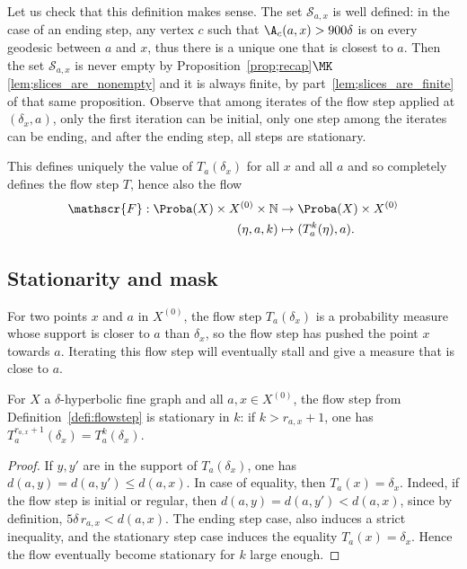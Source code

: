 Let us check that this definition makes sense. The set $\mathcal{S}_{a,x}$ is well defined: in the case of an ending step, any vertex $c$ such that $\A_c(a,x) > 900\delta$ is on every geodesic between $a$ and $x$, thus there is a unique one that is closest to $a$. Then the set $\mathcal{S}_{a,x}$ is never empty by Proposition~\ref{prop;recap}$\MK$\eqref{lem;slices_are_nonempty} and it is always finite, by part~\eqref{lem;slices_are_finite} of that same proposition. Observe that among iterates of the flow step applied at $(\delta_x, a)$, only the first iteration can be initial, only one step among the iterates can be ending, and after the ending step, all steps are stationary.

This defines uniquely the value of $T_a(\delta_x)$ for all $x$ and all $a$ and so completely defines the flow step $T$, hence also the flow
\begin{align*}
\mathscr{F}:\Proba (X) \times X^{(0)}\times\mathbb{N}&\to\Proba (X) \times X^{(0)}\\
(\eta,a,k)&\mapsto (T^k_a(\eta),a).
\end{align*}

\subsection{Stationarity and mask}

For two points $x$ and $a$ in $X^{(0)}$, the flow step $T_a(\delta_x)$ is a probability measure whose support is closer to $a$ than $\delta_x$, so the flow step has pushed the point $x$ towards $a$. Iterating this flow step will eventually stall and give a measure that is close to $a$.

\begin{prop}
For $X$ a $\delta$-hyperbolic fine graph and all $a,x\in X^{(0)}$, the flow step from Definition~\ref{defi:flowstep} is stationary in $k$: if
$k>r_{a,x}+1$, one has $T_a^{r_{a,x} +1} (\delta_x)=T_a^{k} (\delta_x)$.
\end{prop}
\begin{proof}
If $y, y'$ are in the support of $T_a(\delta_x)$, one has $d(a,y) = d(a,y') \leq d(a,x)$. In case of equality, then $T_a(x) = \delta_x$. Indeed, if the flow step is initial or regular, then $d(a,y) = d(a,y') < d(a,x)$, since by definition, $5\delta\,r_{a,x} < d(a,x)$. The ending step case, also induces a strict inequality, and the stationary step case induces the equality $T_a(x) = \delta_x$. Hence the flow eventually become stationary for $k$ large enough.
\end{proof}

